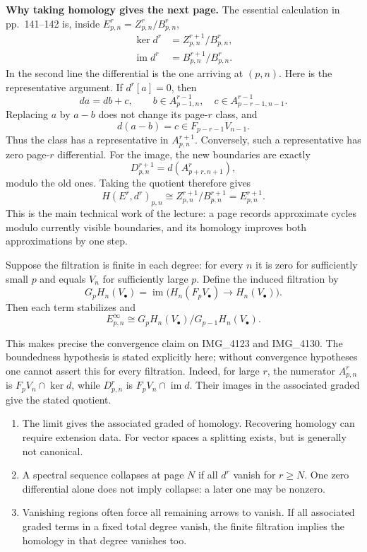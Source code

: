 \medskip\noindent
{\bf Why taking homology gives the next
page.}
The essential calculation in pp.~141--142
is, inside $E^r_{p,n}=Z^r_{p,n}/B^r_{p,n}$,
$$
\begin{aligned}
\ker d^r&=Z^{r+1}_{p,n}/B^r_{p,n},\\
\operatorname{im}d^r
&=B^{r+1}_{p,n}/B^r_{p,n}.
\end{aligned}
$$
In the second line the differential is
the one arriving at $(p,n)$.
Here is the representative argument.
If $d^r[a]=0$, then
$$
da=db+c,
\qquad b\in A^{r-1}_{p-1,n},
\quad c\in A^{r-1}_{p-r-1,n-1}.
$$
Replacing $a$ by $a-b$ does not change
its page-$r$ class, and
$$
d(a-b)=c\in F_{p-r-1}V_{n-1}.
$$
Thus the class has a representative in
$A^{r+1}_{p,n}$. Conversely, such a
representative has zero page-$r$
differential. For the image, the new
boundaries are exactly
$$
D^{r+1}_{p,n}=d(A^r_{p+r,n+1}),
$$
modulo the old ones. Taking the quotient
therefore gives
$$
H(E^r,d^r)_{p,n}\cong
Z^{r+1}_{p,n}/B^{r+1}_{p,n}
=E^{r+1}_{p,n}.
$$
This is the main technical work of the
lecture: a page records approximate
cycles modulo currently visible
boundaries, and its homology improves
both approximations by one step.

\begin{theorem}
\label{theorem-spectral-sequence}
Suppose the filtration is finite in
each degree: for every $n$ it is zero
for sufficiently small $p$ and equals
$V_n$ for sufficiently large $p$.
Define the induced filtration by
$$
G_pH_n(V_\bullet)=
\operatorname{im}\bigl(
H_n(F_pV_\bullet)\longrightarrow
H_n(V_\bullet)\bigr).
$$
Then each term stabilizes and
$$
E^\infty_{p,n}\cong
G_pH_n(V_\bullet)/G_{p-1}H_n(V_\bullet).
$$
\end{theorem}

\noindent
This makes precise the convergence claim
on IMG\_4123 and IMG\_4130. The boundedness
hypothesis is stated explicitly here;
without convergence hypotheses one
cannot assert this for every filtration.
Indeed, for large $r$, the numerator
$A^r_{p,n}$ is $F_pV_n\cap\ker d$, while
$D^r_{p,n}$ is
$F_pV_n\cap\operatorname{im}d$.
Their images in the associated graded
give the stated quotient.

\begin{remark}
\label{remark-spectral-sequence}
\begin{enumerate}
\item The limit gives the associated
 graded of homology. Recovering homology
 can require extension data. For vector
 spaces a splitting exists, but is
 generally not canonical.
\item A spectral sequence collapses at
 page $N$ if all $d^r$ vanish for
 $r\geq N$. One zero differential alone
 does not imply collapse: a later one
 may be nonzero.
\item Vanishing regions often force all
 remaining arrows to vanish. If all
 associated graded terms in a fixed total
 degree vanish, the finite filtration
 implies the homology in that degree
 vanishes too.
\end{enumerate}
\end{remark}

